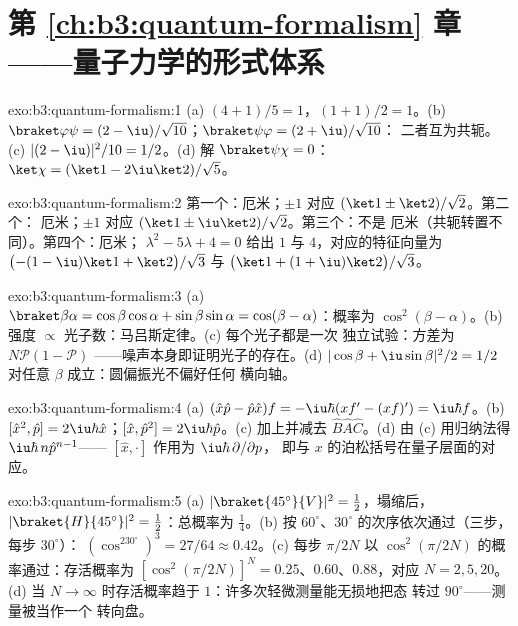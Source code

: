 \section*{第 \ref{ch:b3:quantum-formalism} 章——量子力学的形式体系}

\begin{solution}{exo:b3:quantum-formalism:1}
(a) $(4 + 1)/5 = 1$，$(1 + 1)/2 = 1$。(b) $\braket\varphi\psi =
(2 - \iu)/\sqrt{10}$；$\braket\psi\varphi = (2 + \iu)/\sqrt{10}$：
二者互为共轭。(c) $|(2 - \iu)|^2/10 = 1/2$。(d) 解
$\braket\psi\chi = 0$：$\ket\chi = (\ket1 - 2\iu\ket2)/\sqrt5$。
\end{solution}

\begin{solution}{exo:b3:quantum-formalism:2}
第一个：厄米；$\pm1$ 对应 $(\ket1 \pm \ket2)/\sqrt2$。第二个：
厄米；$\pm1$ 对应 $(\ket1 \pm \iu\ket2)/\sqrt2$。第三个：不是
厄米（共轭转置不同）。第四个：厄米；
$\lambda^2 - 5\lambda + 4 = 0$ 给出 $1$ 与 $4$，对应的特征向量为
$\big({-(1 - \iu)}\ket1 + \ket2\big)/\sqrt3$ 与 $\big(\ket1 +
(1 + \iu)\ket2\big)/\sqrt3$。
\end{solution}

\begin{solution}{exo:b3:quantum-formalism:3}
(a) $\braket\beta\alpha = \cos\beta\cos\alpha + \sin\beta\sin\alpha
= \cos(\beta - \alpha)$：概率为 $\cos^2(\beta - \alpha)$。(b)
强度 $\propto$ 光子数：马吕斯定律。(c) 每个光子都是一次
独立试验：方差为 $N\mathcal P(1 - \mathcal P)$
——噪声本身即证明光子的存在。(d) $|\cos\beta + \iu\sin\beta|^2/2
= 1/2$ 对任意 $\beta$ 成立：圆偏振光不偏好任何
横向轴。
\end{solution}

\begin{solution}{exo:b3:quantum-formalism:4}
(a) $(\hat x\hat p - \hat p\hat x)f = -\iu\hbar(xf' - (xf)') =
\iu\hbar f$。(b) $[\hat x^2, \hat p] = 2\iu\hbar\hat x$；$[\hat x,
\hat p^2] = 2\iu\hbar\hat p$。(c) 加上并减去 $\hat B\hat A
\hat C$。(d) 由 (c) 用归纳法得 $\iu\hbar\,n\hat p^{n-1}$——
$[\hat x, \cdot]$ 作用为 $\iu\hbar\,\partial/\partial p$，
即与 $x$ 的泊松括号在量子层面的对应。
\end{solution}

\begin{solution}{exo:b3:quantum-formalism:5}
(a) $|\braket{45^\circ}{V}|^2 = \tfrac12$，塌缩后，
$|\braket{H}{45^\circ}|^2 = \tfrac12$：总概率为 $\tfrac14$。(b) 按
$60^\circ$、$30^\circ$ 的次序依次通过（三步，每步 $30^\circ$）：
$(\cos^230^\circ)^3 = 27/64 \approx 0.42$。(c) 每步
$\pi/2N$ 以 $\cos^2(\pi/2N)$ 的概率通过：存活概率为 $[\cos^2(\pi/2N)]^N
= 0.25$、$0.60$、$0.88$，对应 $N = 2, 5, 20$。(d) 当 $N \to \infty$
时存活概率趋于 $1$：许多次轻微测量能无损地把态
转过 $90^\circ$——测量被当作一个
转向盘。
\end{solution}

